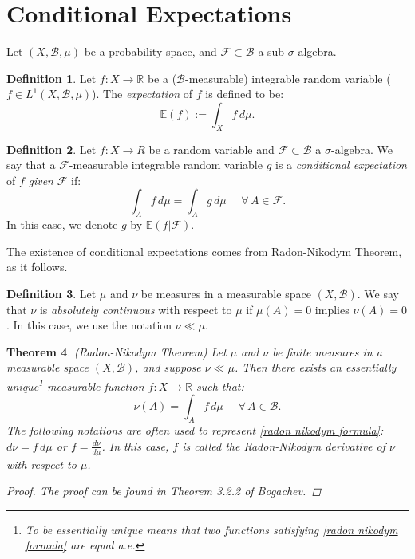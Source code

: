 \documentclass[a4paper]{article}
\theoremstyle{plain}
\newtheorem{theorem}{Theorem}[section] %
\theoremstyle{definition}
\newtheorem{defn}[theorem]{Definition}%
\newcommand{\R}{\mathbb{R}}
\begin{document}
   \section{Conditional Expectations}
	
	Let $(X, \mathcal{B}, \mu)$ be a probability space, and $\mathcal{F} \subset \mathcal{B}$ a sub-$\sigma$-algebra.
	
	\begin{defn}
		Let $f: X \to \R$ be a ($\mathcal{B}$-measurable) integrable random variable ($f \in L^{1}(X,\mathcal{B},\mu)$). The \textit{expectation} of $f$ is defined to be:
		\begin{equation*}
			\mathbb{E}(f) := \int_{X}f\,d\mu.
		\end{equation*}
	\end{defn}
	
	
	\begin{defn}
		Let $f: X \to R$ be a random variable and $\mathcal{F} \subset \mathcal{B}$ a $\sigma$-algebra. We say that a $\mathcal{F}$-measurable integrable random variable $g$ is a \textit{conditional expectation} of $f$ \textit{given} $\mathcal{F}$ if:
		\begin{equation*}
			\int_{A}f\,d\mu = \int_{A}g\,d\mu ~~~~~~ \forall\, A \in \mathcal{F}.
		\end{equation*}
		In this case, we denote $g$ by $\mathbb{E}(f|\mathcal{F})$.
	\end{defn}

	
	The existence of conditional expectations comes from Radon-Nikodym Theorem, as it follows.
	
	\begin{defn}
		Let $\mu$ and $\nu$ be measures in a measurable space $(X, \mathcal{B})$. We say that $\nu$ is \textit{absolutely continuous} with respect to $\mu$ if $\mu(A) = 0$ implies $\nu(A) = 0$. In this case, we use the notation $\nu \ll \mu$.
	\end{defn}

	\begin{theorem}
		\textit{(Radon-Nikodym Theorem)} Let $\mu$ and $\nu$ be finite measures in a measurable space $(X,\mathcal{B})$, and suppose $\nu \ll \mu$. Then there exists an \textit{essentially unique}\footnote{To be essentially unique means that two functions satisfying \eqref{radon nikodym formula} are equal a.e.} measurable function $f: X \to \R$ such that:
		\begin{equation}\label{radon nikodym formula}
			\nu(A) = \int_{A}f\,d\mu ~~~~~~ \forall\, A \in \mathcal{B}.
		\end{equation}
		The following notations are often used to represent \eqref{radon nikodym formula}: $d\nu = f\,d\mu$ or $f = \frac{d\nu}{d\mu}$. In this case, $f$ is called the \textit{Radon-Nikodym derivative} of $\nu$ with respect to $\mu$.
		\begin{proof}
			The proof can be found in Theorem 3.2.2 of Bogachev.
		\end{proof}
	\end{theorem}
	
\end{document}
